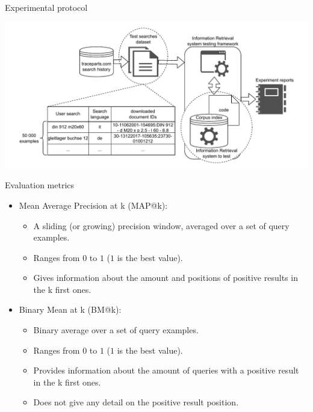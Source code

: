 \begin{frame}{Experimental protocol}

        \vspace{-1em}
        \begin{center}
            \includegraphics[scale=0.55]{images/tp-search-expe-setting.pdf} 
        \end{center}

\end{frame}

\begin{frame}{Evaluation metrics}

    \begin{itemize}
        \item Mean Average Precision at k (MAP@k): 
        \begin{itemize}
            \item A sliding (or growing) precision window, averaged over a set of query examples.
            \item Ranges from $0$ to $1$ ($1$ is the best value).
            \item Gives information about the amount and positions of positive results in the k first ones.
        \end{itemize}
        \item Binary Mean at k (BM@k):
        \begin{itemize}
            \item Binary average over a set of query examples.
            \item Ranges from $0$ to $1$ ($1$ is the best value).
            \item Provides information about the amount of queries with a positive result in the k first ones.
            \item Does not give any detail on the positive result position.
        \end{itemize}
    \end{itemize}

\end{frame}

